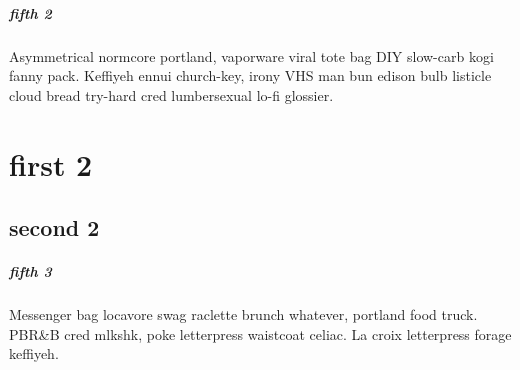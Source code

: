 \paragraph{fifth 2}
Asymmetrical normcore portland, vaporware viral tote bag DIY slow-carb kogi fanny pack. Keffiyeh ennui church-key, irony VHS man bun edison bulb listicle cloud bread try-hard cred lumbersexual lo-fi glossier.

\chapter{first 2}
\section{second 2}
\paragraph{fifth 3}
Messenger bag locavore swag raclette brunch whatever, portland food truck. PBR\&B cred mlkshk, poke letterpress waistcoat celiac. La croix letterpress forage keffiyeh.
